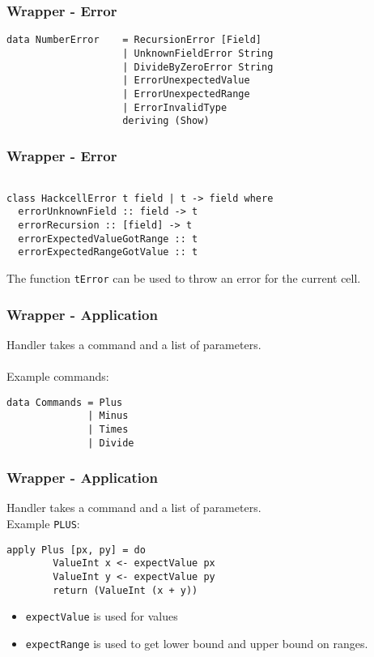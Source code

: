 \documentclass{beamer}
\begin{document}
  \begin{frame}[fragile]
  		\frametitle{Wrapper - Error}
		  		\begin{verbatim}
data NumberError    = RecursionError [Field]
                    | UnknownFieldError String
                    | DivideByZeroError String
                    | ErrorUnexpectedValue
                    | ErrorUnexpectedRange
                    | ErrorInvalidType
                    deriving (Show)
  		\end{verbatim}
  \end{frame}
    \begin{frame}[fragile]
  		\frametitle{Wrapper - Error}
		  		\begin{verbatim}

class HackcellError t field | t -> field where
  errorUnknownField :: field -> t
  errorRecursion :: [field] -> t
  errorExpectedValueGotRange :: t
  errorExpectedRangeGotValue :: t
  		\end{verbatim}
  		The function \texttt{tError} can be used to throw an error for the current cell.
  \end{frame}
	    \begin{frame}[fragile]
  		\frametitle{Wrapper - Application}
  		Handler takes a command and a list of parameters.
  		\\\\
  		Example commands:
  		\begin{verbatim}
data Commands = Plus
              | Minus
              | Times
              | Divide        
  		\end{verbatim}
  \end{frame}  
  \begin{frame}[fragile]
  \frametitle{Wrapper - Application}
  		Handler takes a command and a list of parameters.
  		\\
  		Example \texttt{PLUS}:
  		\begin{verbatim}
apply Plus [px, py] = do
		ValueInt x <- expectValue px 
		ValueInt y <- expectValue py
		return (ValueInt (x + y))
  		\end{verbatim}
  		\begin{itemize}
  		\item \texttt{expectValue} is used for values
  		\item \texttt{expectRange} is used to get lower bound and upper bound on ranges.
  		\end{itemize}
  \end{frame}  
\end{document}
